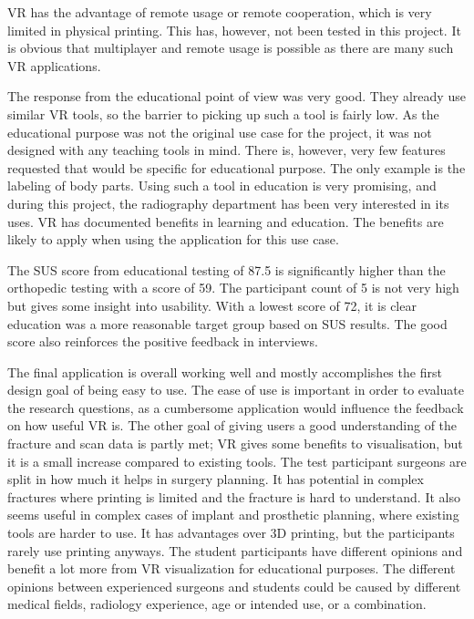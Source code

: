 \documentclass[a4paper]{report}
\begin{document}
VR has the advantage of remote usage or remote cooperation, which is very limited in physical printing. This has, however, not been tested in this project. It is obvious that multiplayer and remote usage is possible as there are many such VR applications.




The response from the educational point of view was very good. They already use similar VR tools, so the barrier to picking up such a tool is fairly low.
As the educational purpose was not the original use case for the project, it was not designed with any teaching tools in mind. There is, however, very few features requested that would be specific for educational purpose. The only example is the labeling of body parts. 
Using such a tool in education is very promising, and during this project, the radiography department has been very interested in its uses.
VR has documented benefits in learning and education. The benefits are likely to apply when using the application for this use case.

The SUS score from educational testing of 87.5 is significantly higher than the orthopedic testing with a score of 59.
The participant count of 5 is not very high but gives some insight into usability. With a lowest score of 72, it is clear education was a more reasonable target group based on SUS results. The good score also reinforces the positive feedback in interviews.

The final application is overall working well and mostly accomplishes the first design goal of being easy to use. The ease of use is important in order to evaluate the research questions, as a cumbersome application would influence the feedback on how useful VR is.
The other goal of giving users a good understanding of the fracture and scan data is partly met; VR gives some benefits to visualisation, but it is a small increase compared to existing tools.
The test participant surgeons are split in how much it helps in surgery planning.
It has potential in complex fractures where printing is limited and the fracture is hard to understand. It also seems useful in complex cases of implant and prosthetic planning, where existing tools are harder to use.
It has advantages over 3D printing, but the participants rarely use printing anyways.
The student participants have different opinions and benefit a lot more from VR visualization for educational purposes. The different opinions between experienced surgeons and students could be caused by different medical fields, radiology experience, age or intended use, or a combination.
\end{document}
